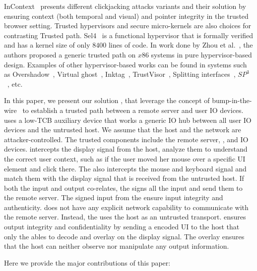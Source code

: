 InContext~\cite{huang2012clickjacking} presents different clickjacking attacks variants and their solution by ensuring context (both temporal and visual) and pointer integrity in the trusted browser setting. Trusted hypervisors and secure micro-kernels are also choices for contrasting Trusted path. Sel4~\cite{klein2009sel4} is a functional hypervisor that is formally verified and has a kernel size of only $8400$ lines of code. In work done by Zhou et al.~\cite{zhou2012building}, the authors proposed a generic trusted path on $x86$ systems in pure hypervisor-based design. Examples of other hypervisor-based works can be found in systems such as Overshadow~\cite{Overshadow}, Virtual ghost~\cite{criswell2014virtual}, Inktag~\cite{hofmann2013inktag}, TrustVisor~\cite{mccune2010trustvisor}, Splitting interfaces~\cite{ta2006splitting}, $SP^3$~\cite{yang2008using}, etc.


 In this paper, we present our solution \name, that leverage the concept of bump-in-the-wire~\cite{McCPerRei2006} to establish a trusted path between a remote server and user IO devices. \name uses a low-TCB auxiliary device that works a generic IO hub between all user IO devices and the untrusted host. 
We assume that the host and the network are attacker-controlled. The trusted components include the remote server, \device, and IO devices. \device intercepts the display signal from the host, analyze them to understand the correct user context, such as if the user moved her mouse over a specific UI element and click there. The \device also intercepts the mouse and keyboard signal and match them with the display signal that is received from the untrusted host. If both the input and output co-relates, the \device signs all the input and send them to the remote server. The signed input from the \device ensure input integrity and authenticity. \device does not have any explicit network capability to communicate with the remote server. Instead, the \device uses the host as an untrusted transport. \device ensures output integrity and confidentiality by sending a encoded UI to the host that only the \device ables to decode and overlay on the display signal. The overlay ensures that the host can neither observe nor manipulate any output information. 



 Here we provide the major contributions of this paper:
\begin{mylist}
  \item
\end{mylist}

